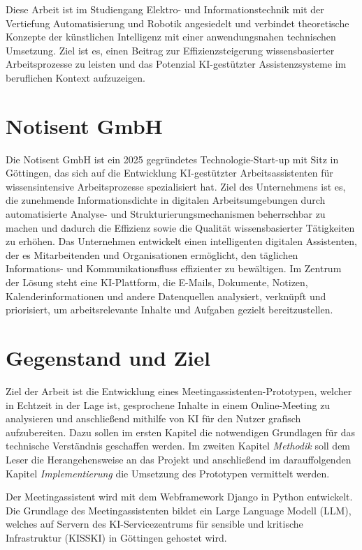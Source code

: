 Diese Arbeit ist im Studiengang Elektro- und Informationstechnik mit der Vertiefung Automatisierung und Robotik angesiedelt und verbindet theoretische Konzepte der künstlichen Intelligenz mit einer anwendungsnahen technischen Umsetzung. Ziel ist es, einen Beitrag zur Effizienzsteigerung wissensbasierter Arbeitsprozesse zu leisten und das Potenzial KI-gestützter Assistenzsysteme im beruflichen Kontext aufzuzeigen.

\section{Notisent GmbH}
Die Notisent GmbH \cite{notisent} ist ein 2025 gegründetes Technologie-Start-up mit Sitz in Göttingen, das sich auf die Entwicklung KI-gestützter Arbeitsassistenten für wissensintensive Arbeitsprozesse spezialisiert hat. 
Ziel des Unternehmens ist es, die zunehmende Informationsdichte in digitalen Arbeitsumgebungen durch automatisierte Analyse- und Strukturierungsmechanismen beherrschbar zu machen und dadurch die Effizienz sowie die Qualität wissensbasierter Tätigkeiten zu erhöhen. 
Das Unternehmen entwickelt einen intelligenten digitalen Assistenten, der es Mitarbeitenden und Organisationen ermöglicht, den täglichen Informations- und Kommunikationsfluss effizienter zu bewältigen. Im Zentrum der Lösung steht eine KI-Plattform, die E-Mails, Dokumente, Notizen, Kalenderinformationen und andere Datenquellen analysiert, verknüpft und priorisiert, um arbeitsrelevante Inhalte und Aufgaben gezielt bereitzustellen. 

\newpage
\section{Gegenstand und Ziel}
Ziel der Arbeit ist die Entwicklung eines Meetingassistenten-Prototypen, welcher in Echtzeit in der Lage ist, gesprochene Inhalte in einem Online-Meeting zu analysieren und anschließend mithilfe von KI für den Nutzer grafisch aufzubereiten. Dazu sollen im ersten Kapitel die notwendigen Grundlagen für das technische Verständnis geschaffen werden. Im zweiten Kapitel \textit{Methodik} soll dem Leser die Herangehensweise an das Projekt und anschließend im darauffolgenden Kapitel \textit{Implementierung} die Umsetzung des Prototypen vermittelt werden. 

Der Meetingassistent wird mit dem Webframework Django \cite{django} in Python entwickelt. Die Grundlage des Meetingassistenten bildet ein Large Language Modell (LLM), welches auf Servern des KI-Servicezentrums für sensible und kritische Infrastruktur (KISSKI) \cite{kisski} in Göttingen gehostet wird. 

